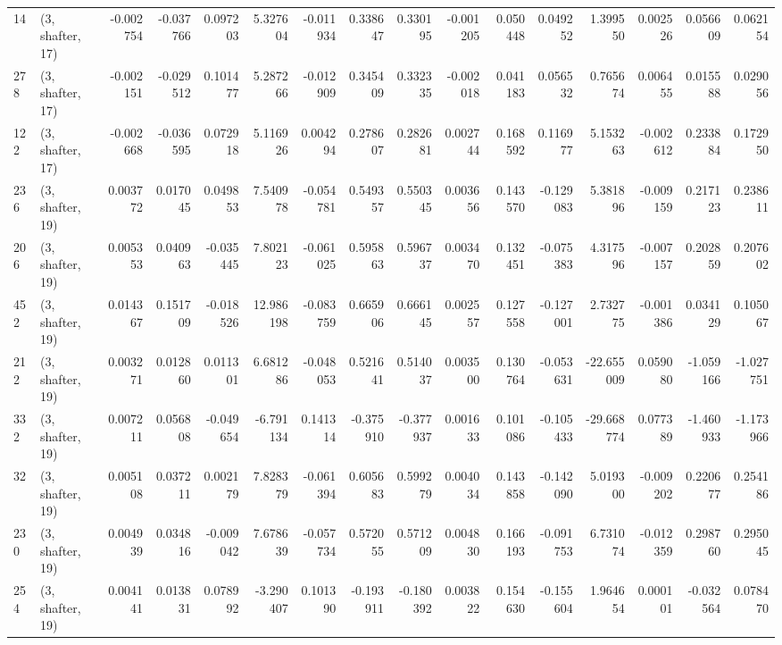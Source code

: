 \begin{tabular}{llrrrrrrrrrrrrrr}
14  &  (3, shafter, 17) &  -0.002754 & -0.037766 &  0.097203 &    5.327604 & -0.011934 &   0.338647 &  0.330195 & -0.001205 &  0.050448 &  0.049252 &    1.399550 &  0.002526 &  0.056609 &  0.062154 \\
278 &  (3, shafter, 17) &  -0.002151 & -0.029512 &  0.101477 &    5.287266 & -0.012909 &   0.345409 &  0.332335 & -0.002018 &  0.041183 &  0.056532 &    0.765674 &  0.006455 &  0.015588 &  0.029056 \\
122 &  (3, shafter, 17) &  -0.002668 & -0.036595 &  0.072918 &    5.116926 &  0.004294 &   0.278607 &  0.282681 &  0.002744 &  0.168592 &  0.116977 &    5.153263 & -0.002612 &  0.233884 &  0.172950 \\
236 &  (3, shafter, 19) &   0.003772 &  0.017045 &  0.049853 &    7.540978 & -0.054781 &   0.549357 &  0.550345 &  0.003656 &  0.143570 & -0.129083 &    5.381896 & -0.009159 &  0.217123 &  0.238611 \\
206 &  (3, shafter, 19) &   0.005353 &  0.040963 & -0.035445 &    7.802123 & -0.061025 &   0.595863 &  0.596737 &  0.003470 &  0.132451 & -0.075383 &    4.317596 & -0.007157 &  0.202859 &  0.207602 \\
452 &  (3, shafter, 19) &   0.014367 &  0.151709 & -0.018526 &   12.986198 & -0.083759 &   0.665906 &  0.666145 &  0.002557 &  0.127558 & -0.127001 &    2.732775 & -0.001386 &  0.034129 &  0.105067 \\
212 &  (3, shafter, 19) &   0.003271 &  0.012860 &  0.011301 &    6.681286 & -0.048053 &   0.521641 &  0.514037 &  0.003500 &  0.130764 & -0.053631 &  -22.655009 &  0.059080 & -1.059166 & -1.027751 \\
332 &  (3, shafter, 19) &   0.007211 &  0.056808 & -0.049654 &   -6.791134 &  0.141314 &  -0.375910 & -0.377937 &  0.001633 &  0.101086 & -0.105433 &  -29.668774 &  0.077389 & -1.460933 & -1.173966 \\
32  &  (3, shafter, 19) &   0.005108 &  0.037211 &  0.002179 &    7.828379 & -0.061394 &   0.605683 &  0.599279 &  0.004034 &  0.143858 & -0.142090 &    5.019300 & -0.009202 &  0.220677 &  0.254186 \\
230 &  (3, shafter, 19) &   0.004939 &  0.034816 & -0.009042 &    7.678639 & -0.057734 &   0.572055 &  0.571209 &  0.004830 &  0.166193 & -0.091753 &    6.731074 & -0.012359 &  0.298760 &  0.295045 \\
254 &  (3, shafter, 19) &   0.004141 &  0.013831 &  0.078992 &   -3.290407 &  0.101390 &  -0.193911 & -0.180392 &  0.003822 &  0.154630 & -0.155604 &    1.964654 &  0.000101 & -0.032564 &  0.078470 \\

\end{tabular}
